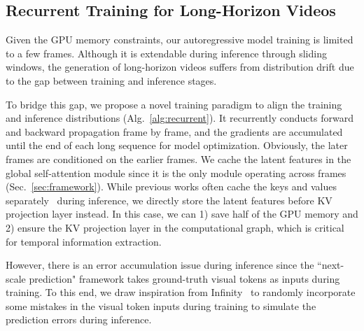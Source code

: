 \subsection{Recurrent Training for Long-Horizon Videos}
\label{sec:training}

Given the GPU memory constraints, our autoregressive model training is limited to a few frames. Although it is extendable during inference through sliding windows, the generation of long-horizon videos suffers from distribution drift due to the gap between training and inference stages. 

To bridge this gap, we propose a novel training paradigm to align the training and inference distributions (Alg.~\ref{alg:recurrent}). It recurrently conducts forward and backward propagation frame by frame, and the gradients are accumulated until the end of each long sequence for model optimization. Obviously, the later frames are conditioned on the earlier frames. We cache the latent features in the global self-attention module since it is the only module operating across frames (Sec.~\ref{sec:framework}). While previous works often cache the keys and values separately~\cite{dai2019transformer,shoeybi2019megatron} during inference, we directly store the latent features before KV projection layer instead. In this case, we can 1) save half of the GPU memory and 2) ensure the KV projection layer in the computational graph, which is critical for temporal information extraction.

However, there is an error accumulation issue during inference since the ``next-scale prediction" framework takes ground-truth visual tokens as inputs during training. To this end, we draw inspiration from Infinity~\cite{han2024infinity} to randomly incorporate some mistakes in the visual token inputs during training to simulate the prediction errors during inference.
